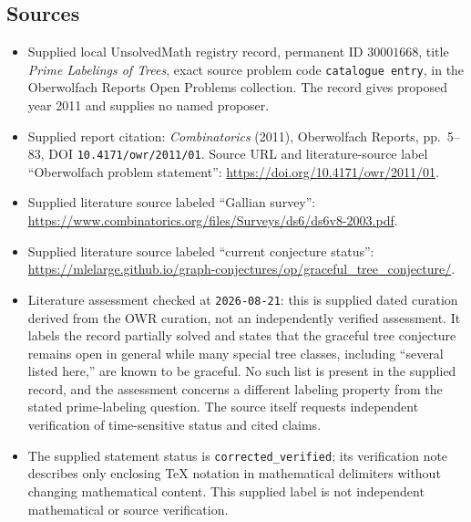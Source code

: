 \documentclass[11pt]{article}
\begin{document}
\subsection{Sources}
\begin{itemize}
\item Supplied local UnsolvedMath registry record, permanent ID \(30001668\), title \emph{Prime Labelings of Trees}, exact source problem code \texttt{catalogue entry}, in the Oberwolfach Reports Open Problems collection. The record gives proposed year 2011 and supplies no named proposer.
\item Supplied report citation: \emph{Combinatorics} (2011), Oberwolfach Reports, pp.~5--83, DOI \texttt{10.4171/owr/2011/01}. Source URL and literature-source label ``Oberwolfach problem statement'': \url{https://doi.org/10.4171/owr/2011/01}.
\item Supplied literature source labeled ``Gallian survey'': \url{https://www.combinatorics.org/files/Surveys/ds6/ds6v8-2003.pdf}.
\item Supplied literature source labeled ``current conjecture status'': \url{https://mlelarge.github.io/graph-conjectures/op/graceful_tree_conjecture/}.
\item Literature assessment checked at \texttt{2026-08-21}: this is supplied dated curation derived from the OWR curation, not an independently verified assessment. It labels the record partially solved and states that the graceful tree conjecture remains open in general while many special tree classes, including ``several listed here,'' are known to be graceful. No such list is present in the supplied record, and the assessment concerns a different labeling property from the stated prime-labeling question. The source itself requests independent verification of time-sensitive status and cited claims.
\item The supplied statement status is \texttt{corrected\_verified}; its verification note describes only enclosing TeX notation in mathematical delimiters without changing mathematical content. This supplied label is not independent mathematical or source verification.
\end{itemize}
\end{document}
